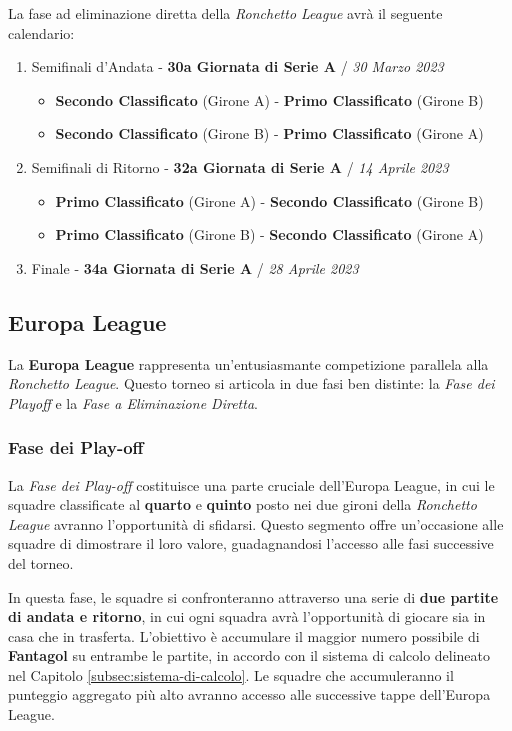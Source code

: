 \documentclass[12pt]{article}
\begin{document}
La fase ad eliminazione diretta della \textit{Ronchetto League} avrà il seguente calendario:
\begin{enumerate}
    \item Semifinali d'Andata - \textbf{30a Giornata di Serie A} / \textit{30 Marzo 2023}
    \begin{itemize}
        \item \textbf{Secondo Classificato} (Girone A) - \textbf{Primo Classificato} (Girone B) 
        \item \textbf{Secondo Classificato} (Girone B) - \textbf{Primo Classificato} (Girone A) 
    \end{itemize}
    \item Semifinali di Ritorno - \textbf{32a Giornata di Serie A} / \textit{14 Aprile 2023}
    \begin{itemize}
        \item \textbf{Primo Classificato} (Girone A) - \textbf{Secondo Classificato} (Girone B) 
        \item \textbf{Primo Classificato} (Girone B) - \textbf{Secondo Classificato} (Girone A) 
    \end{itemize}
    \item Finale - \textbf{34a Giornata di Serie A} / \textit{28 Aprile 2023}
\end{enumerate}

\subsection{Europa League}

La \textbf{Europa League} rappresenta un'entusiasmante competizione parallela alla \textit{Ronchetto League}. Questo torneo si articola in due fasi ben distinte: la \textit{Fase dei Playoff} e la \textit{Fase a Eliminazione Diretta}.

\subsubsection{Fase dei Play-off}

La \textit{Fase dei Play-off} costituisce una parte cruciale dell'Europa League, in cui le squadre classificate al \textbf{quarto} e \textbf{quinto} posto nei due gironi della \textit{Ronchetto League} avranno l'opportunità di sfidarsi. Questo segmento offre un'occasione alle squadre di dimostrare il loro valore, guadagnandosi l'accesso alle fasi successive del torneo.

In questa fase, le squadre si confronteranno attraverso una serie di \textbf{due partite di andata e ritorno}, in cui ogni squadra avrà l'opportunità di giocare sia in casa che in trasferta. L'obiettivo è accumulare il maggior numero possibile di \textbf{Fantagol} su entrambe le partite, in accordo con il sistema di calcolo delineato nel Capitolo \ref{subsec:sistema-di-calcolo}. Le squadre che accumuleranno il punteggio aggregato più alto avranno accesso alle successive tappe dell'Europa League.
\end{document}
